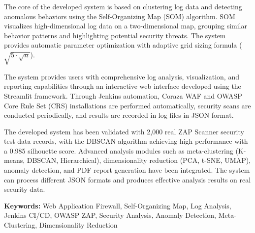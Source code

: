 The core of the developed system is based on clustering log data and detecting anomalous behaviors using the Self-Organizing Map (SOM) algorithm. SOM visualizes high-dimensional log data on a two-dimensional map, grouping similar behavior patterns and highlighting potential security threats. The system provides automatic parameter optimization with adaptive grid sizing formula ($\sqrt{5 \cdot \sqrt{n}}$).

The system provides users with comprehensive log analysis, visualization, and reporting capabilities through an interactive web interface developed using the Streamlit framework. Through Jenkins automation, Coraza WAF and OWASP Core Rule Set (CRS) installations are performed automatically, security scans are conducted periodically, and results are recorded in log files in JSON format.

The developed system has been validated with 2,000 real ZAP Scanner security test data records, with the DBSCAN algorithm achieving high performance with a 0.985 silhouette score. Advanced analysis modules such as meta-clustering (K-means, DBSCAN, Hierarchical), dimensionality reduction (PCA, t-SNE, UMAP), anomaly detection, and PDF report generation have been integrated. The system can process different JSON formats and produces effective analysis results on real security data.

\textbf{Keywords:} Web Application Firewall, Self-Organizing Map, Log Analysis, Jenkins CI/CD, OWASP ZAP, Security Analysis, Anomaly Detection, Meta-Clustering, Dimensionality Reduction

\pagebreak{}


